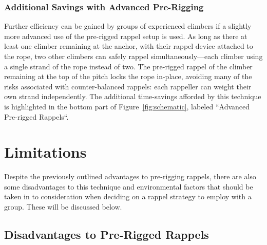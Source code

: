 \documentclass[nonacm,acmtog]{acmart}
\begin{document}

\subsubsection{Additional Savings with Advanced Pre-Rigging}
\label{sec:advanced}

  Further efficiency can be gained by groups of experienced climbers if a
  slightly more advanced use of the pre-rigged rappel setup is used.  As long
  as there at least one climber remaining at the anchor, with their rappel device
  attached to the rope, two other climbers can safely rappel
  simultaneously---each climber using a single strand of the rope instead of
  two.  The pre-rigged rappel of the climber remaining at the top of the pitch
  locks the rope in-place, avoiding many of the risks associated with
  counter-balanced rappels: each rappeller can weight their own strand
  independently.  The additional time-savings afforded by this technique is
  highlighted in the bottom part of Figure~\ref{fig:schematic}, labeled
  ``Advanced Pre-rigged Rappels``.


\section{Limitations}
\label{sec:limitations}

  Despite the previously outlined advantages to pre-rigging rappels, there are
  also some disadvantages to this technique and environmental factors that
  should be taken in to consideration when deciding on a rappel strategy to
  employ with a group.  These will be discussed below.

\subsection{Disadvantages to Pre-Rigged Rappels}
\end{document}
